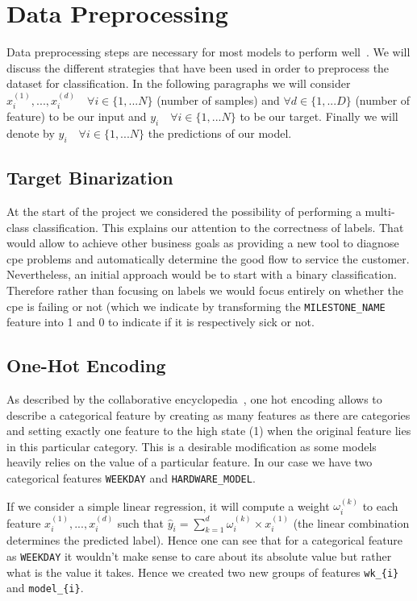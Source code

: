 \section{Data Preprocessing}
\label{sec:datapreprocessing}
Data preprocessing steps are necessary for most models to perform well~\cite{data_preproc}. We will discuss the different strategies that have been used in order to preprocess the dataset for classification. In the following paragraphs we will consider $x_i^{(1)},...,x_i^{(d)} \quad \forall i\in \{1,...N\}$ (number of samples) and  $\forall d \in \{1,...D\}$ (number of feature) to be our input and $y_i \quad \forall i\in \{1,...N\}$ to be our target. Finally we will denote by $\hat{y}_i \quad \forall i\in \{1,...N\}$ the predictions of our model.

\subsection{Target Binarization}
At the start of the project we considered the possibility of performing a multi-class classification. This explains our attention to the correctness of labels. That would allow to achieve other business goals as providing a new tool to diagnose \acrshort{cpe} problems and automatically determine the good flow to service the customer. Nevertheless, an initial approach would be to start with a binary classification. Therefore rather than focusing on labels we would focus entirely on whether the \acrshort{cpe} is failing or not (which we indicate by transforming the \texttt{MILESTONE\_NAME} feature into 1 and 0 to indicate if it is respectively sick or not.
 
\subsection{One-Hot Encoding}
\label{subsec:one_hot}
As described by the collaborative encyclopedia~\cite{wiki:onehot}, one hot encoding allows to describe a categorical feature by creating as many features as there are categories and setting exactly one feature to the high state (1) when the original feature lies in this particular category. This is a desirable modification as some models heavily relies on the value of a particular feature. In our case we have two categorical features \texttt{WEEKDAY} and \texttt{HARDWARE\_MODEL}. 

If we consider a simple linear regression, it will compute a weight $\omega_i^{(k)}$ to each feature $x_i^{(1)},...,x_i^{(d)}$ such that $\hat{y}_i=\sum_{k=1}^d{\omega_i^{(k)}\times x_i^{(1)}}$ (the linear combination determines the predicted label). Hence one can see that for a categorical feature as \texttt{WEEKDAY} it wouldn't make sense to care about its absolute value but rather what is the value it takes. Hence we created two new groups of features \texttt{wk\_\{i\}} and \texttt{model\_\{i\}}.

